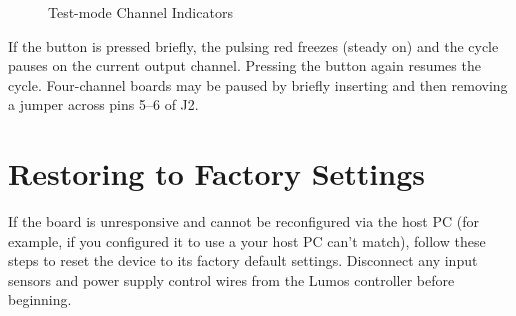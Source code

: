 \documentclass[letterpaper,twoside,onecolumn,openright,final]{memoir}
\begin{document}
\begin{figure}
\begin{center}
  \end{center}
  \caption{Test-mode Channel Indicators\label{fig:testbin}}
\end{figure}

If the  button is pressed briefly, the pulsing red  freezes (steady on) and the cycle
pauses on the current output channel.  Pressing the  button again resumes the cycle.
Four-channel boards may be paused by briefly inserting and then removing a jumper across pins 5--6 of J2.
      
\section{Restoring to Factory Settings}\label{ss:factoryreset}
If the board is unresponsive and cannot be reconfigured via the host PC (for example, if you configured
it to use a  your host PC can't match), follow these steps to reset the device to its 
factory default settings.  Disconnect any input sensors and power supply control wires from the Lumos
controller before beginning.
\end{document}
